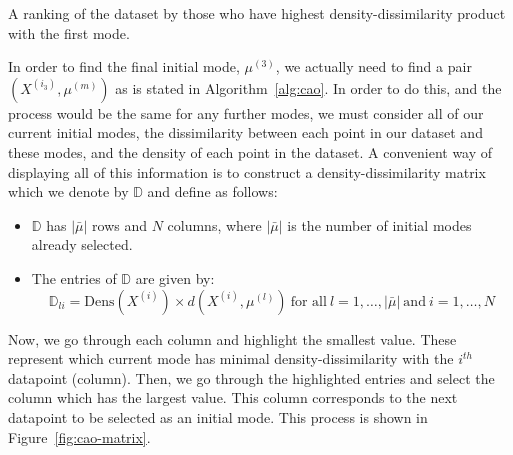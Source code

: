 \begin{example}
    \begin{table}[H]
        \singlespacing{%
        \resizebox{\textwidth}{!}{%
            
        }}
        \caption{A ranking of the dataset by those who have highest
            density-dissimilarity product with the first
            mode.}\label{tab:ranked-dens-dissim}
    \end{table}

    In order to find the final initial mode, \(\mu^{(3)}\), we actually need to
    find a pair \((X^{(i_3)}, \mu^{(m)})\) as is stated in 
    Algorithm~\ref{alg:cao}. In order to do this, and the process would be the
    same for any further modes, we must consider all of our current initial
    modes, the dissimilarity between each point in our dataset and these modes,
    and the density of each point in the dataset. A convenient way of displaying
    all of this information is to construct a density-dissimilarity matrix which
    we denote by \(\mathbb{D}\) and define as follows:
    \begin{itemize}
        \item \(\mathbb{D}\) has \(|\bar{\mu}|\) rows and \(N\) columns, where
            \(|\bar{\mu}|\) is the number of initial modes already selected.
        \item The entries of \(\mathbb{D}\) are given by:
            \[
                \mathbb{D}_{li} = \text{Dens}(X^{(i)}) \times d(X^{(i)},
                \mu^{(l)}) \ \text{for all} \ l = 1, \ldots, |\bar{\mu}| \
                \text{and} \ i = 1, \ldots, N
            \]
    \end{itemize}

    Now, we go through each column and highlight the smallest value. These
    represent which current mode has minimal density-dissimilarity with the
    \(i^{th}\) datapoint (column). Then, we go through the highlighted entries
    and select the column which has the largest value. This column corresponds
    to the next datapoint to be selected as an initial mode. This process is
    shown in Figure~\ref{fig:cao-matrix}.
    
    \begin{figure}[H]
        \centering
\end{figure}
\end{example}
